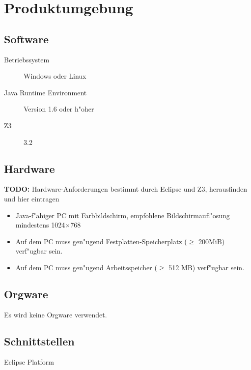 \section{Produktumgebung}%

\subsection{Software}%

\begin{description}%
    \item [Betriebssystem] \see Windows oder \see Linux%
    \item [\see Java Runtime Environment] Version 1.6 oder h"oher%
    \item [\see Z3] 3.2%
\end{description}%

\subsection{Hardware}%

\textbf{TODO:} Hardware-Anforderungen bestimmt durch Eclipse und Z3, herausfinden und hier eintragen%

\begin{itemize}%
    \item \see Java-f"ahiger PC mit Farbbildschirm, empfohlene Bildschirmaufl"osung mindestens 1024$\times$768%
    \item Auf dem PC muss gen"ugend Festplatten-Speicherplatz ($\ge$ 200MiB) verf"ugbar sein.%
    \item Auf dem PC muss gen"ugend Arbeitsspeicher ($\ge$ 512 MB) verf"ugbar sein.%
\end{itemize}%

\subsection{Orgware}%

Es wird keine \see Orgware verwendet.%

\subsection{Schnittstellen}%

\begin{description}%
    \item [\see Eclipse Platform]%
\end{description}%
